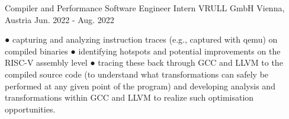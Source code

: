 
\begin{cventries}

  \cventry
    {Compiler and Performance Software Engineer Intern} %
    {VRULL GmbH} %
    {Vienna, Austria} %
    {Jun. 2022 - Aug. 2022} %
    {
      \begin{cvitems} %
        \item {
● capturing and analyzing instruction traces (e.g., captured with qemu) on compiled binaries
● identifying hotspots and potential improvements on the RISC-V assembly level
● tracing these back through GCC and LLVM to the compiled source code (to understand what
transformations can safely be performed at any given point of the program) and developing
analysis and transformations within GCC and LLVM to realize such optimisation opportunities.}
      \end{cvitems}
    }


\end{cventries}
